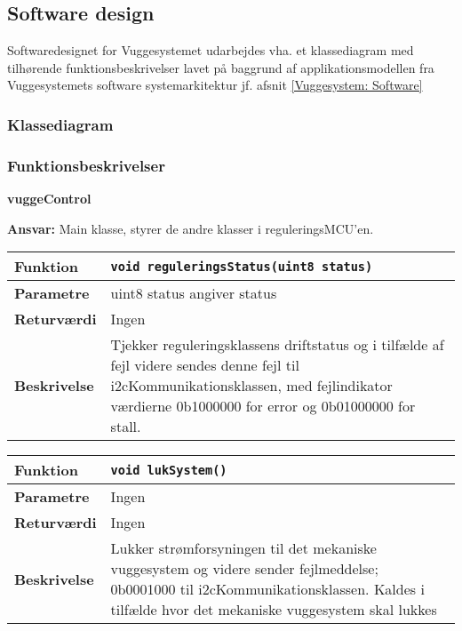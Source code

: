 \newpage
\subsection{Software design}
Softwaredesignet for Vuggesystemet udarbejdes vha. et klassediagram med tilhørende funktionsbeskrivelser lavet på baggrund af applikationsmodellen fra Vuggesystemets software systemarkitektur jf. afsnit \ref{Vuggesystem: Software}

\subsubsection*{Klassediagram}

\subsubsection*{Funktionsbeskrivelser}
{\centering
\textbf{vuggeControl}\par
}
\textbf{Ansvar:} Main klasse, styrer de andre klasser i reguleringsMCU'en. \

\begin{center}
    \begin{tabular}{ | l | p{} |}
    \hline
    \textbf{Funktion}	& \verb+void reguleringsStatus(uint8 status) +						\\ \hline
    \textbf{Parametre} 	& uint8 status angiver status		\\ \hline
    \textbf{Returværdi}	& Ingen 								\\ \hline
    \textbf{Beskrivelse}	& Tjekker reguleringsklassens driftstatus og i tilfælde af fejl videre sendes denne fejl til i2cKommunikationsklassen, med fejlindikator værdierne 0b1000000 for error og 0b01000000 for stall.		\\ \hline
    \end{tabular}
\end{center}

\begin{center}
    \begin{tabular}{ | l | p{} |}
    \hline
    \textbf{Funktion}	& \verb+void lukSystem() +						\\ \hline
    \textbf{Parametre} 	& Ingen		\\ \hline
    \textbf{Returværdi}	& Ingen 								\\ \hline
    \textbf{Beskrivelse}	& Lukker strømforsyningen til det mekaniske vuggesystem og videre sender fejlmeddelse; 0b0001000 til i2cKommunikationsklassen. Kaldes i tilfælde hvor det mekaniske vuggesystem skal lukkes		\\ \hline
    \end{tabular}
\end{center}

